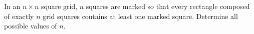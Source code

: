 In an $n \times n$ square grid, $n$ squares are marked so that every rectangle composed of exactly $n$ grid squares contains at least one marked square. Determine all possible values of $n$.